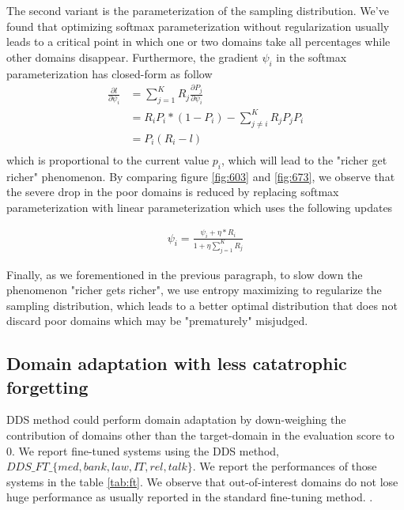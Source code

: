 \documentclass[12pt,times,a4paper,twoside]{article}
\newcommand{\fyTodo}[1]{\Todo[FY:]{\textcolor{orange}{#1}}}
\theoremstyle{definition}
\begin{document}
The second variant is the parameterization of the sampling distribution. We've found that optimizing softmax parameterization without regularization usually leads to a critical point in which one or two domains take all percentages while other domains disappear. Furthermore, the gradient $\psi_i$ in the softmax parameterization has closed-form as follow
\begin{align*}
\frac{\partial l}{\partial \psi_i} & = \displaystyle{\mathop{\sum}_{j=1}^K} R_j \frac{\partial P_j}{\partial \psi_i} \\
	& = R_i P_i*(1-P_i) - \displaystyle{\mathop{\sum}_{j\neq i}^K} R_j P_j P_i \\
	& = P_i(R_i-l)\\
\end{align*} 
which is proportional to the current value $p_i$, which will lead to the "richer get richer" phenomenon. By comparing figure \ref{fig:603} and \ref{fig:673}, we observe that the severe drop in the poor domains is reduced by replacing softmax parameterization with linear parameterization which uses the following updates

\begin{align*}
\psi_i = \frac{\psi_i + \eta * R_i}{ 1 + \eta \displaystyle{\mathop{\sum}_{j=1}^K} R_j}
\end{align*}

Finally, as we forementioned in the previous paragraph, to slow down the phenomenon "richer gets richer", we use entropy maximizing to regularize the sampling distribution, which leads to a better optimal distribution that does not discard poor domains which may be "prematurely" misjudged.

\subsection{Domain adaptation with less catatrophic forgetting}
DDS method could perform domain adaptation by down-weighing the contribution of domains other than the target-domain in the evaluation score to 0. We report fine-tuned systems using the DDS method, $DDS\_FT\_\{ med, bank, law, IT, rel, talk \}$. We report the performances of those systems in the table \ref{tab:ft}. We observe that out-of-interest domains do not lose huge performance as usually reported in the standard fine-tuning method. \fyTodo{to compare with mixed domain adaptation of Dabre}.
\end{document}
